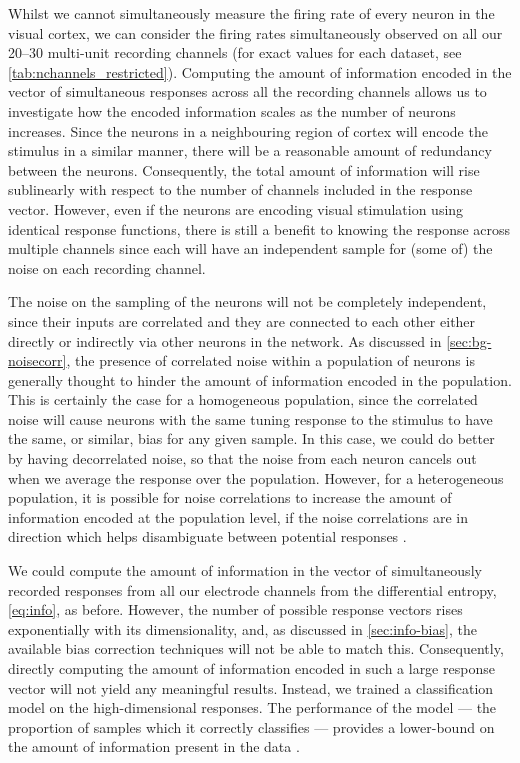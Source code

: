Whilst we cannot simultaneously measure the firing rate of every neuron in the visual cortex, we can consider the firing rates simultaneously observed on all our \numrange{20}{30} multi-unit recording channels (for exact values for each dataset, see \autoref{tab:nchannels_restricted}).
Computing the amount of information encoded in the vector of simultaneous responses across all the recording channels allows us to investigate how the encoded information scales as the number of neurons increases.
Since the neurons in a neighbouring region of cortex will encode the stimulus in a similar manner, there will be a reasonable amount of redundancy between the neurons.
Consequently, the total amount of information will rise sublinearly with respect to the number of channels included in the response vector.
However, even if the neurons are encoding visual stimulation using identical response functions, there is still a benefit to knowing the response across multiple channels since each will have an independent sample for (some of) the noise on each recording channel.

The noise on the sampling of the neurons will not be completely independent, since their inputs are correlated and they are connected to each other either directly or indirectly via other neurons in the network.
As discussed in \autoref{sec:bg-noisecorr}, the presence of correlated noise within a population of neurons is generally thought to hinder the amount of information encoded in the population.
This is certainly the case for a homogeneous population, since the correlated noise will cause neurons with the same tuning response to the stimulus to have the same, or similar, bias for any given sample.
In this case, we could do better by having decorrelated noise, so that the noise from each neuron cancels out when we average the response over the population.
However, for a heterogeneous population, it is possible for noise correlations to increase the amount of information encoded at the population level, if the noise correlations are in direction which helps disambiguate between potential responses \citep{Averbeck2006,Moreno-Bote2014}.

We could compute the amount of information in the vector of simultaneously recorded responses from all our electrode channels from the differential entropy, \autoref{eq:info}, as before.
However, the number of possible response vectors rises exponentially with its dimensionality, and, as discussed in \autoref{sec:info-bias}, the available bias correction techniques will not be able to match this.
Consequently, directly computing the amount of information encoded in such a large response vector will not yield any meaningful results.
Instead, we trained a classification model on the high-dimensional responses.
The performance of the model --- the proportion of samples which it correctly classifies --- provides a lower-bound on the amount of information present in the data \citep{Quiroga2009}.

